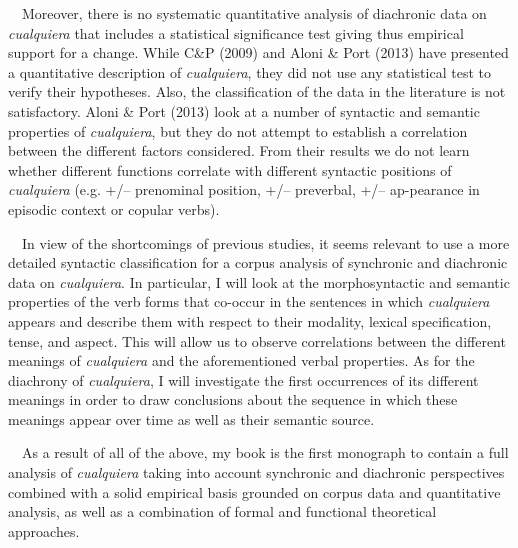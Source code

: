 \documentclass[10pt]{article}
\newenvironment{styleStandard}{\renewcommand\baselinestretch{1.25}\setlength\leftskip{0cm}\setlength\rightskip{0cm}\setlength\parindent{0cm}\setlength\parfillskip{0pt plus 1fil}\setlength\parskip{0in plus 1pt}\writerlistparindent\writerlistleftskip\leavevmode\normalfont\normalsize\fontsize{12pt}{14.4pt}\selectfont\writerlistlabel\ignorespaces}{\unskip\vspace{0in plus 1pt}\par}
\newcommand\writerlistleftskip{}
\newcommand\writerlistparindent{}
\newcommand\writerlistlabel{}
\begin{document}
\begin{styleStandard}
\ \ Moreover, there is no systematic quantitative analysis of diachronic data on \textit{cualquiera} that includes a statistical significance test giving thus empirical support for a change. While C\&P (2009) and Aloni \& Port (2013) have presented a quantitative description of \textit{cualquiera}, they did not use any statistical test to verify their hypotheses. Also, the classification of the data in the literature is not satisfactory. Aloni \& Port (2013) look at a number of syntactic and semantic properties of \textit{cualquiera}, but they do not attempt to establish a correlation between the different factors considered. From their results we do not learn whether different functions correlate with different syntactic positions of \textit{cualquiera} (e.g. +/– prenominal position, +/– preverbal, +/– ap-pearance in episodic context or copular verbs). 
\end{styleStandard}

\begin{styleStandard}
\ \ In view of the shortcomings of previous studies, it seems relevant to use a more detailed syntactic classification for a corpus analysis of synchronic and diachronic data on \textit{cualquiera}. In particular, I will look at the morphosyntactic and semantic properties of the verb forms that co-occur in the sentences in which \textit{cualquiera} appears and describe them with respect to their modality, lexical specification, tense, and aspect. This will allow us to observe correlations between the different meanings of \textit{cualquiera} and the aforementioned verbal properties. As for the diachrony of \textit{cualquiera}, I will investigate the first occurrences of its different meanings in order to draw conclusions about the sequence in which these meanings appear over time as well as their semantic source.
\end{styleStandard}

\begin{styleStandard}
\ \ As a result of all of the above, my book is the first monograph to contain a full analysis of \textit{cualquiera} taking into account synchronic and diachronic perspectives combined with a solid empirical basis grounded on corpus data and quantitative analysis, as well as a combination of formal and functional theoretical approaches.
\end{styleStandard}
\end{document}
